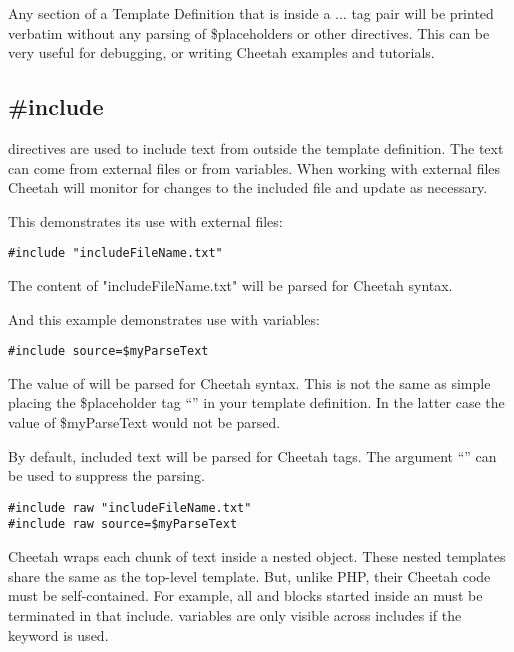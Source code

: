 Any section of a Template Definition that is inside a  ...
 tag pair will be printed verbatim without any parsing of
\$placeholders or other directives. This can be very useful for debugging, or
writing Cheetah examples and tutorials.


\subsection{\#include}
\label{directives.include}

 directives are used to include text from outside the template
definition.  The text can come from external files or from 
variables.  When working with external files Cheetah will monitor for changes to
the included file and update as necessary.  

This demonstrates its use with external files:
\begin{verbatim}
#include "includeFileName.txt"
\end{verbatim}
The content of "includeFileName.txt" will be parsed for Cheetah syntax.

And this example demonstrates use with  variables:
\begin{verbatim}
#include source=$myParseText
\end{verbatim}
The value of  will be parsed for Cheetah syntax. This is not
the same as simple placing the \$placeholder tag ``'' in
your template definition.  In the latter case the value of \$myParseText would
not be parsed.

By default, included text will be parsed for Cheetah tags.  The argument
``'' can be used to suppress the parsing.

\begin{verbatim}
#include raw "includeFileName.txt"
#include raw source=$myParseText
\end{verbatim}

Cheetah wraps each chunk of  text inside a nested
 object.  These nested templates share the same 
as the top-level template. But, unlike PHP, their Cheetah code must be
self-contained.  For example, all  and  blocks started
inside an  must be terminated in that include. 
variables are only visible across includes if the  keyword is
used.


